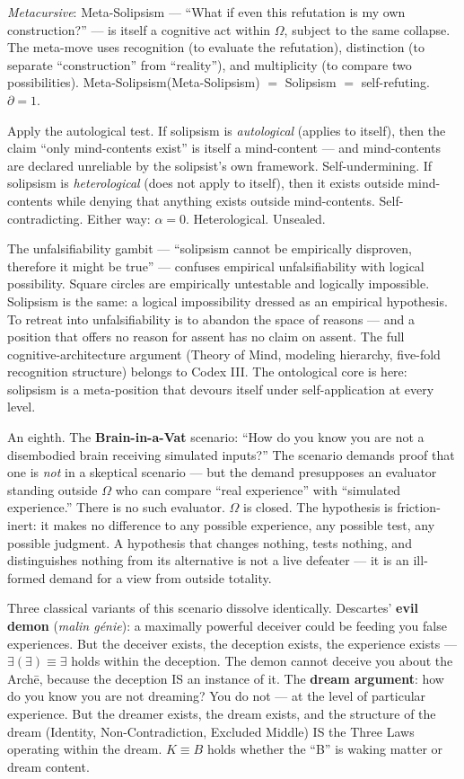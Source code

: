 \documentclass[10pt, openany, oneside]{book}
\begin{document}
\textit{Metacursive}: Meta-Solipsism --- ``What if even this refutation is my own construction?'' --- is itself a cognitive act within $\Omega$, subject to the same collapse. The meta-move uses recognition (to evaluate the refutation), distinction (to separate ``construction'' from ``reality''), and multiplicity (to compare two possibilities). Meta-Solipsism(Meta-Solipsism) $=$ Solipsism $=$ self-refuting. $\partial = 1$.

Apply the autological test. If solipsism is \textit{autological} (applies to itself), then the claim ``only mind-contents exist'' is itself a mind-content --- and mind-contents are declared unreliable by the solipsist's own framework. Self-undermining. If solipsism is \textit{heterological} (does not apply to itself), then it exists outside mind-contents while denying that anything exists outside mind-contents. Self-contradicting. Either way: $\alpha = 0$. Heterological. Unsealed.

The unfalsifiability gambit --- ``solipsism cannot be empirically disproven, therefore it might be true'' --- confuses empirical unfalsifiability with logical possibility. Square circles are empirically untestable and logically impossible. Solipsism is the same: a logical impossibility dressed as an empirical hypothesis. To retreat into unfalsifiability is to abandon the space of reasons --- and a position that offers no reason for assent has no claim on assent. The full cognitive-architecture argument (Theory of Mind, modeling hierarchy, five-fold recognition structure) belongs to Codex III. The ontological core is here: solipsism is a meta-position that devours itself under self-application at every level.

An eighth. The \textbf{Brain-in-a-Vat} scenario: ``How do you know you are not a disembodied brain receiving simulated inputs?'' The scenario demands proof that one is \textit{not} in a skeptical scenario --- but the demand presupposes an evaluator standing outside $\Omega$ who can compare ``real experience'' with ``simulated experience.'' There is no such evaluator. $\Omega$ is closed. The hypothesis is friction-inert: it makes no difference to any possible experience, any possible test, any possible judgment. A hypothesis that changes nothing, tests nothing, and distinguishes nothing from its alternative is not a live defeater --- it is an ill-formed demand for a view from outside totality.

Three classical variants of this scenario dissolve identically. Descartes' \textbf{evil demon} (\textit{malin g\'{e}nie}): a maximally powerful deceiver could be feeding you false experiences. But the deceiver exists, the deception exists, the experience exists --- $\exists(\exists) \equiv \exists$ holds within the deception. The demon cannot deceive you about the Arch\={e}, because the deception IS an instance of it. The \textbf{dream argument}: how do you know you are not dreaming? You do not --- at the level of particular experience. But the dreamer exists, the dream exists, and the structure of the dream (Identity, Non-Contradiction, Excluded Middle) IS the Three Laws operating within the dream. $K \equiv B$ holds whether the ``B'' is waking matter or dream content.
\end{document}
